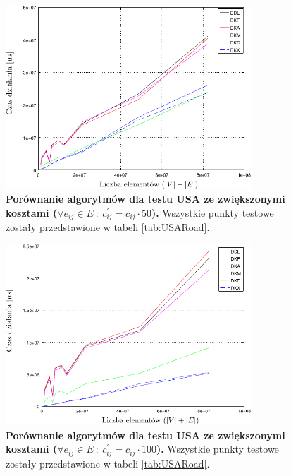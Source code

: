 \begin{figure}[!htbp]
	\centering
	\includegraphics[width=0.82\textwidth]{Chapter_IV/graphx10Cost_psfrag.pdf}
	\caption{\textbf{\textbf{Porównanie algorytmów dla testu \textsc{USA}} ze zwiększonymi kosztami ($\forall e_{ij} \in E \: : \: c^{'}_{ij} = c_{ij} \cdot 50$).} Wszystkie punkty testowe zostały przedstawione w tabeli \ref{tab:USARoad}.} \label{fig:plotgraphx50Cost}
\end{figure}
\begin{figure}[!htbp]
	\centering
	\includegraphics[width=0.82\textwidth]{Chapter_IV/graphx50Cost_psfrag.pdf}
	\caption{\textbf{\textbf{Porównanie algorytmów dla testu \textsc{USA}} ze zwiększonymi kosztami ($\forall e_{ij} \in E \: : \: c^{'}_{ij} = c_{ij} \cdot 100$).} Wszystkie punkty testowe zostały przedstawione w tabeli \ref{tab:USARoad}.} \label{fig:plotgraphx100Cost}
\end{figure}

